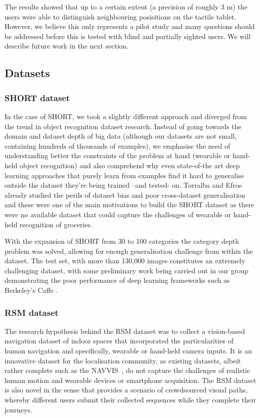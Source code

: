 The results showed that up to a certain extent (a precision of roughly 3 m) the users were able to distinguish neighbouring posisitions on the tactile tablet. However, we believe this only represents a pilot study and many questions should be addressed before this is tested with blind and partially sighted users. We will describe future work in the next section.

\subsection{Datasets}

\subsubsection{SHORT dataset}

In the case of SHORT, we took a slightly different approach and diverged from the trend in object recognition dataset research. Instead of going towards the domain and dataset depth of big data (although our datasets are not small, containing hundreds of thousands of examples), we emphasise the need of understanding better the constraints of the problem at hand (wearable or hand-held object recognition) and also comprehend why even state-of-the art deep learning approaches that purely learn from examples find it hard to generalise outside the dataset they're being trained --and tested- on. Torralba and Efros already studied the perils of dataset bias and poor cross-dataset generalisation \cite{torralba2011unbiased} and these were one of the main motivations to build the SHORT dataset as there were no available dataset that could capture the challenges of wearable or hand-held recognition of groceries.

With the expansion of SHORT from 30 to 100 categories the category depth problem was solved, allowing for enough generalisation challenge from within the dataset. The test set, with more than	 130,000 images constitutes an extremely challenging dataset, with some preliminary work  being carried out in our group demonstrating the poor performance of deep learning frameworks such as Berkeley's Caffe \cite{jia2014caffe}.

\subsubsection{RSM dataset}

The research hypothesis behind the RSM dataset was to collect a vision-based navigation dataset of indoor spaces that incorporated the particularities of human navigation and specifically, wearable or hand-held camera inputs. It is an innovative dataset for the localisation community, as existing datasets, albeit rather complete such as the NAVVIS~\cite{Huitl2012}, do not capture the challenges of realistic human motion and wearable devices or smartphone acquisition. The RSM dataset is also novel in the sense that provides a scenario of crowdsourced visual paths, whereby   different users submit their collected sequences while they complete their journeys. 

